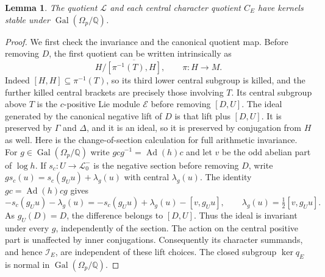 \documentclass[11pt]{article}
\newtheorem{lemma}[theorem]{Lemma}
\theoremstyle{definition}\newtheorem{definition}[theorem]{Definition}
\begin{document}
\begin{lemma}\label{lem:class-two-invariance}
The quotient $\mathcal L$ and each central character quotient $C_E$ have kernels stable under $\operatorname{Gal}(\Omega_p/\mathbb Q)$.
\end{lemma}
\begin{proof}
We first check the invariance and the canonical quotient map.
Before removing $D$, the first quotient can be written
intrinsically as
\[
 H/\overline{[\pi^{-1}(T),H]},\qquad \pi:H\longrightarrow M.
\]
Indeed $[H,H]\subseteq\pi^{-1}(T)$, so its third lower
central subgroup is killed, and the further killed central
brackets are precisely those involving $T$.
Its central subgroup above $T$ is the $c$-positive Lie
module $\mathcal E$ before removing $[D,U]$.
The ideal generated by the canonical negative lift of $D$
is that lift plus $[D,U]$.
It is preserved by $\Gamma$ and $\Delta$, and it is an ideal,
so it is preserved by conjugation from $H$ as well.
Here is the change-of-section calculation for full arithmetic
invariance. For $g\in\operatorname{Gal}(\Omega_p/\mathbb Q)$ write
$gcg^{-1}=\operatorname{Ad}(h)c$ and let $v$ be the odd abelian
part of $\log h$. If $s_c:U\to\mathcal L_0^-$ is the negative
section before removing $D$, write
$g s_c(u)=s_c(g_Uu)+\lambda_g(u)$ with central $\lambda_g(u)$.
The identity $gc=\operatorname{Ad}(h)cg$ gives
\[
 -s_c(g_Uu)-\lambda_g(u)
 =-s_c(g_Uu)+\lambda_g(u)-[v,g_Uu],
 \qquad \lambda_g(u)=\tfrac12[v,g_Uu].
\]
As $g_U(D)=D$, the difference belongs to $[D,U]$. Thus the
ideal is invariant under every $g$, independently of the section.
The action on the central positive part is unaffected by inner
conjugations.  Consequently
its character summands, and hence $\mathcal I_E$, are
independent of these lift choices.  The closed subgroup
$\ker q_E$ is normal in $\operatorname{Gal}(\Omega_p/\mathbb Q)$.

\end{proof}
\end{document}
